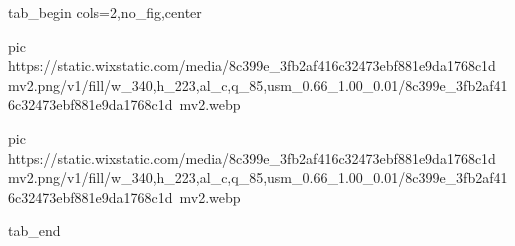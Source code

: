  
 
 
 
 

\ifcmt
  tab_begin cols=2,no_fig,center

     pic https://static.wixstatic.com/media/8c399e_3fb2af416c32473ebf881e9da1768c1d~mv2.png/v1/fill/w_340,h_223,al_c,q_85,usm_0.66_1.00_0.01/8c399e_3fb2af416c32473ebf881e9da1768c1d~mv2.webp

		 pic https://static.wixstatic.com/media/8c399e_3fb2af416c32473ebf881e9da1768c1d~mv2.png/v1/fill/w_340,h_223,al_c,q_85,usm_0.66_1.00_0.01/8c399e_3fb2af416c32473ebf881e9da1768c1d~mv2.webp

  tab_end
\fi
